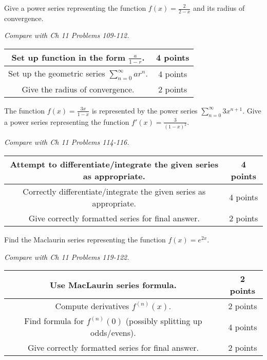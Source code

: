 \documentclass[12pt]{exam}
\begin{document}
\begin{questions}
\vfill

\newpage

\question[10]
Give a power series representing the function $f(x)=\frac{2}{2-x}$ and
its radius of convergence.

\textit{Compare with Ch 11 Problems 109-112.}

\begin{center}
  \begin{tabular}{|c|c|}
    \hline
    Set up function in the form $\frac{a}{1-r}$. & 4 points \\
    \hline
    Set up the geometric series $\sum_{n=0}^\infty ar^n$. & 4 points \\
    \hline
    Give the radius of convergence. & 2 points \\
    \hline
  \end{tabular}
\end{center}

\vfill

\newpage

\question[10]
The function $f(x)=\frac{3x}{1-x}$ is represented by the power series
$\sum_{n=0}^\infty 3x^{n+1}$. Give a power series representing the function
$f'(x)=\frac{3}{(1-x)^2}$.

\textit{Compare with Ch 11 Problems 114-116.}

\begin{center}
  \begin{tabular}{|c|c|}
    \hline
    Attempt to differentiate/integrate the given series as appropriate.
    & 4 points \\
    \hline
    Correctly differentiate/integrate the given series as appropriate.
    & 4 points \\
    \hline
    Give correctly formatted series for final answer. & 2 points \\
    \hline
  \end{tabular}
\end{center}

\vfill

\newpage

\question[10]
Find the Maclaurin series representing the function $f(x)=e^{2x}$.

\textit{Compare with Ch 11 Problems 119-122.}

\begin{center}
  \begin{tabular}{|c|c|}
    \hline
    Use MacLaurin series formula. & 2 points \\
    \hline
    Compute derivatives $f^{(n)}(x)$. & 2 points \\
    \hline
    Find formula for $f^{(n)}(0)$ (possibly splitting up odds/evens).
    & 4 points \\
    \hline
    Give correctly formatted series for final answer. & 2 points \\
    \hline
  \end{tabular}
\end{center}


\end{questions}
\end{document}
